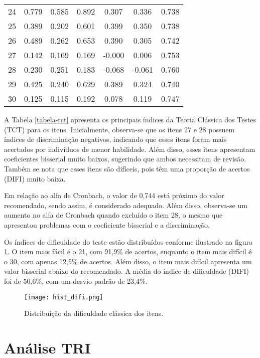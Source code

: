 \begin{table}[H]
{\begin{tabular*}{.6\textwidth}{@{\extracolsep{\fill}}ccccccc@{}}
			24 & 0.779 & 0.585 & 0.892 & 0.307 & 0.336 & 0.738 \\ 
			25 & 0.389 & 0.202 & 0.601 & 0.399 & 0.350 & 0.738 \\ 
			26 & 0.489 & 0.262 & 0.653 & 0.390 & 0.305 & 0.742 \\ 
			27 & 0.142 & 0.169 & 0.169 & -0.000 & 0.006 & 0.753 \\ 
			28 & 0.230 & 0.251 & 0.183 & -0.068 & -0.061 & 0.760 \\ 
			29 & 0.425 & 0.240 & 0.629 & 0.389 & 0.324 & 0.740 \\ 
			30 & 0.125 & 0.115 & 0.192 & 0.078 & 0.119 & 0.747 \\  
			\bottomrule
		\end{tabular*}
	}{%
	}
\end{table}

A Tabela \ref{tabela-tct} apresenta os principais índices da Teoria Clássica dos Testes (TCT) para os itens. Inicialmente, observa-se que os itens 27 e 28 possuem índices de discriminação negativos, indicando que esses itens foram mais acertados por indivíduos de menor habilidade. Além disso, esses itens apresentam coeficientes bisserial muito baixos, sugerindo que ambos necessitam de revisão. Também se nota que esses itens são difíceis, pois têm uma proporção de acertos (DIFI) muito baixa.

Em relação ao alfa de Cronbach, o valor de 0,744 está próximo do valor recomendado, sendo assim, é considerado adequado. Além disso, observa-se um aumento no alfa de Cronbach quando excluído o item 28, o mesmo que apresentou problemas com o coeficiente bisserial e a discriminação.



Os índices de dificuldade do teste estão distribuídos conforme ilustrado na figura \ref{fig:hist_difi}. O item mais fácil é o 21, com 91,9\% de acertos, enquanto o item mais difícil é o 30, com apenas 12,5\% de acertos. Além disso, o item mais difícil apresenta um valor bisserial abaixo do recomendado. A média do índice de dificuldade (DIFI) foi de 50,6\%, com um desvio padrão de 23,4\%.

\begin{figure}[H]
	\centering
	\texttt{[image: hist\_difi.png]}
	\caption{Distribuição da dificuldade clássica dos itens.}
	\label{fig:hist_difi}
\end{figure}


\section{Análise TRI}

